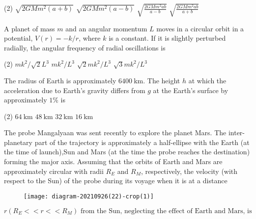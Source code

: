 \begin{enumerate}
\begin{minipage}{\textwidth}
\end{minipage}
\begin{tasks}(2)
	\task[\textbf{A.}]$\sqrt{2 G M m^{2}(a+b)}$
	\task[\textbf{B.}]$\sqrt{2 G M m^{2}(a-b)}$
	\task[\textbf{C.}]$\sqrt{\frac{2 G M m^{2} a b}{a-b}}$
	\task[\textbf{D.}]$\sqrt{\frac{2 G M m^{2} a b}{a+b}}$
\end{tasks}
\begin{minipage}{\textwidth}
	\item A planet of mass $m$ and an angular momentum $L$ moves in a circular orbit in a potential, $V(r)=-k / r$, where $k$ is a constant. If it is slightly perturbed radially, the angular frequency of radial oscillations is
\end{minipage}
\begin{tasks}(2)
	\task[\textbf{A.}] $m k^{2} / \sqrt{2} L^{3}$
	\task[\textbf{B.}]$m k^{2} / L^{3}$
	\task[\textbf{C.}]$\sqrt{2} m k^{2} / L^{3}$
	\task[\textbf{D.}]$\sqrt{3} m k^{2} / L^{3}$
\end{tasks}
\begin{minipage}{\textwidth}
	\item The radius of Earth is approximately $6400 \mathrm{~km}$. The height $h$ at which the acceleration due to Earth's gravity differs from $g$ at the Earth's surface by approximately $1 \%$ is
\end{minipage}
\begin{tasks}(2)
	\task[\textbf{A.}] $64 \mathrm{~km}$
	\task[\textbf{B.}] $48 \mathrm{~km}$
	\task[\textbf{C.}]$32 \mathrm{~km}$
	\task[\textbf{D.}]$16 \mathrm{~km}$
\end{tasks}
\begin{minipage}{\textwidth}
	\item The probe Mangalyaan was sent recently to explore the planet Mars. The inter-planetary part of the trajectory is approximately a half-ellipse with the Earth (at the time of launch),Sun and Mars (at the time the probe reaches the destination) forming the major axis. Assuming that the orbits of Earth and Mars are approximately circular with radii $R_{E}$ and $R_{M}$, respectively, the velocity (with respect to the Sun) of the probe during its voyage when it is at a distance
	\begin{figure}[H]
		\centering
		\texttt{[image: diagram-20210926(22)-crop(1)]}
	\end{figure}
	$r\left(R_{E}<<r<<R_{M}\right) \text { from the Sun, neglecting the effect of Earth and Mars, is }$

\end{minipage}
\end{enumerate}
